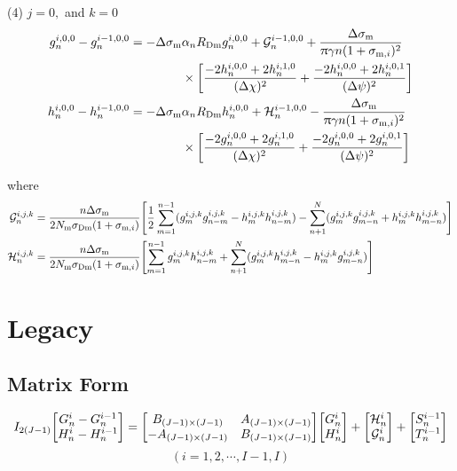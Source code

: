 \documentclass{article}
\begin{document}
(4) $j = 0,$ and $k =0$
\begin{align}
	g_n^{i,0,0}-g_n^{i-1,0,0} = - \Delta\sigma_\text{m}&\alpha_n R_\text{Dm} g_n^{i,0,0}
	+\mathcal{G}_n^{i-1,0,0}
	+\frac{\Delta\sigma_{\mathrm{m}}}{\uppi \gamma n(1+\sigma_{\mathrm{m},i})^2} \nonumber\\
	&\times\qty[\frac{-2h_n^{i,0,0}+2h_n^{i,1,0}}{(\Delta \chi)^2}
	+ \frac{-2h_n^{i,0,0} + 2h_n^{i,0,1} }{(\Delta \psi)^2}]\\
	h_n^{i,0,0}-h_n^{i-1,0,0} = - \Delta\sigma_\text{m}&\alpha_n R_\text{Dm} h_n^{i,0,0}
	+\mathcal{H}_n^{i-1,0,0}
	-\frac{\Delta\sigma_\text{m}}{\uppi \gamma n(1+\sigma_{\mathrm{m},i})^2} \nonumber\\
	&\times\qty[\frac{-2g_n^{i,0,0}+2g_n^{i,1,0}}{(\Delta \chi)^2}
	+ \frac{-2g_n^{i,0,0} + 2g_n^{i,0,1} }{(\Delta \psi)^2}]
\end{align}

where 
\begin{align}
	\mathcal{G}_n^{i,j,k} &= \frac{n\Delta \sigma_\text{m}}{2N_\text{m} \sigma_\text{Dm}
	(1+\sigma_{\mathrm{m},i})}
	\qty[\frac12 \sum_{m=1}^{n-1} (g_m^{i,j,k} g_{n-m}^{i,j,k}-
	h_{m}^{i,j,k} h_{n-m}^{i,j,k}) - 
	\sum_{n+1}^N (g_{m}^{i,j,k}g_{m-n}^{i,j,k} + h_{m}^{i,j,k} h_{m-n}^{i,j,k})]\\
	\mathcal{H}_n^{i,j,k} &= \frac{n\Delta \sigma_\text{m}}{2N_\text{m} \sigma_\text{Dm}
	(1+\sigma_{\mathrm{m},i})}
	\qty[\sum_{m=1}^{n-1} g_m^{i,j,k} h_{n-m}^{i,j,k}
	+\sum_{n+1}^N (g_{m}^{i,j,k}h_{m-n}^{i,j,k} - h_{m}^{i,j,k} g_{m-n}^{i,j,k})]
\end{align}
\section{Legacy}


\subsection{Matrix Form}
\begin{align}
	I_{2(J-1)} \mqty[G_n^i-G_n^{i-1}\\ H_n^i-H_n^{i-1}] 
= \mqty[B_{(J-1)\times(J-1)} & A_{(J-1)\times(J-1)}\\ -A_{(J-1)\times(J-1)} & B_{(J-1)\times(J-1)}] \mqty[G_n^i\\ H_n^i] 
+\mqty[\mathcal{H}_n^i\\ \mathcal{G}_n^i]
+\mqty[S_n^{i-1}\\ T_n^{i-1}]
\end{align}
$$
(i=1,2,\cdots, I-1,I)
$$
\end{document}
